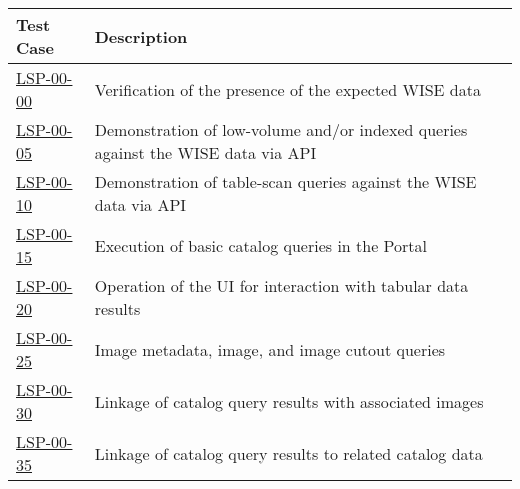 \begin{longtable} {|p{}|p{}|}\hline
\textbf{Test Case}  & \textbf{Description} \\\hline

\hyperref[lsp-00-00]{LSP-00-00} & Verification of the presence of the expected WISE data \\\hline
\hyperref[lsp-00-05]{LSP-00-05} & Demonstration of low-volume and/or indexed queries against the WISE data via API \\\hline
\hyperref[lsp-00-10]{LSP-00-10} & Demonstration of table-scan queries against the WISE data via API \\\hline
\hyperref[lsp-00-15]{LSP-00-15} & Execution of basic catalog queries in the Portal \\\hline
\hyperref[lsp-00-20]{LSP-00-20} & Operation of the UI for interaction with tabular data results \\\hline
\hyperref[lsp-00-25]{LSP-00-25} & Image metadata, image, and image cutout queries \\\hline
\hyperref[lsp-00-30]{LSP-00-30} & Linkage of catalog query results with associated images \\\hline
\hyperref[lsp-00-35]{LSP-00-35} & Linkage of catalog query results to related catalog data \\\hline

\end{longtable}
